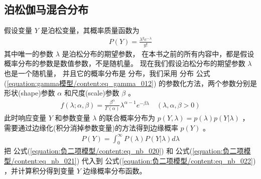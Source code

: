 \documentclass[letterpaper,10pt,english]{sphinxmanual}
\begin{document}
\subsection{泊松\sphinxhyphen{}伽马混合分布}
\label{\detokenize{_u8d1f_u4e8c_u9879_u6a21_u578b/content:id4}}
假设变量 \(Y\) 是泊松变量，其概率质量函数为
\begin{equation}\label{equation:负二项模型/content:eq_nb_020}
\begin{split}P(Y) = \frac{\lambda^y e^{-\lambda}} {y!}\end{split}
\end{equation}
其中唯一的参数 \(\lambda\) 是泊松分布的期望参数，
在本书之前的所有内容中，都是假设概率分布的参数是数值参数，不是随机量。
现在我们假设泊松分布的期望参数 \(\lambda\) 也是一个随机量，
并且它的概率分布是  分布，我们采用  分布 公式(\ref{equation:gamma模型/content:eq_gamma_012})
的参数化方法，两个参数分别是形状(shape)参数 \(\alpha\) 和尺度(scale)参数 \(\beta\) 。
\begin{equation}\label{equation:负二项模型/content:eq_nb_021}
\begin{split}f(\lambda;\alpha,\beta) =
\frac{  \beta^{\alpha} }{ \Gamma(\alpha)} \lambda^{\alpha-1} e^{-\beta \lambda  }
\quad (\lambda,\alpha,\beta > 0)\end{split}
\end{equation}
此时响应变量 \(Y\) 和参数变量 \(\lambda\) 的联合概率分布为
\(p(Y,\lambda)=p(\lambda) p(Y|\lambda)\) ，
需要通过边缘化(积分消掉参数变量)的方法得到边缘概率 \(p(Y)\) 。
\begin{equation}\label{equation:负二项模型/content:eq_nb_022}
\begin{split}P(Y) = \int_0^{\infty} P(\lambda) P(Y|\lambda) d \lambda\end{split}
\end{equation}
把 公式(\ref{equation:负二项模型/content:eq_nb_020}) 和 公式(\ref{equation:负二项模型/content:eq_nb_021}) 代入到  公式(\ref{equation:负二项模型/content:eq_nb_022})
，并计算积分得到变量 \(Y\) 边缘概率分布函数。
\end{document}
